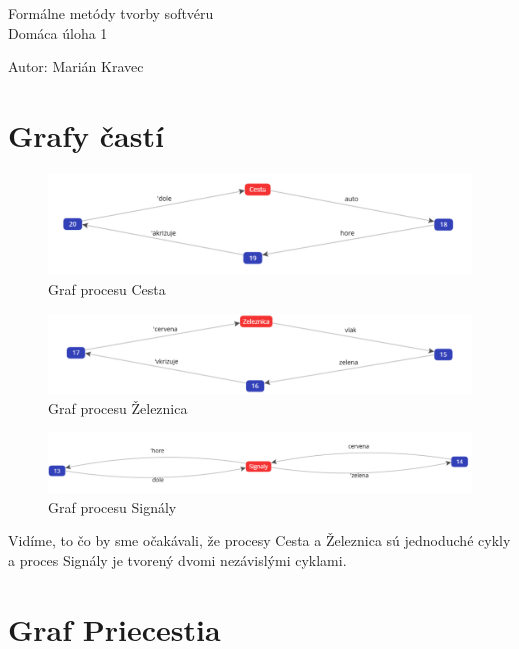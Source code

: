 \documentclass[a4paper]{article}
\begin{document}
 
	
\pagestyle{plain}

\begin{center}
	\sc\large
	Formálne metódy tvorby softvéru\\
	Domáca úloha 1 
\end{center}

Autor: Marián Kravec

\section{Grafy častí}

\begin{figure}[!h]
	\centering
	\includegraphics[width=1\textwidth]{cesta.png}
	\caption{Graf procesu Cesta}
\end{figure}

\begin{figure}[!h]
	\centering
	\includegraphics[width=1\textwidth]{zeleznica.png}
	\caption{Graf procesu Železnica}
\end{figure}

\begin{figure}[!h]
	\centering
	\includegraphics[width=1\textwidth]{signaly.png}
	\caption{Graf procesu Signály}
\end{figure}

Vidíme, to čo by sme očakávali, že procesy Cesta a Železnica sú jednoduché cykly a proces Signály je tvorený dvomi nezávislými cyklami.

\newpage
\section{Graf Priecestia} 
\end{document}
